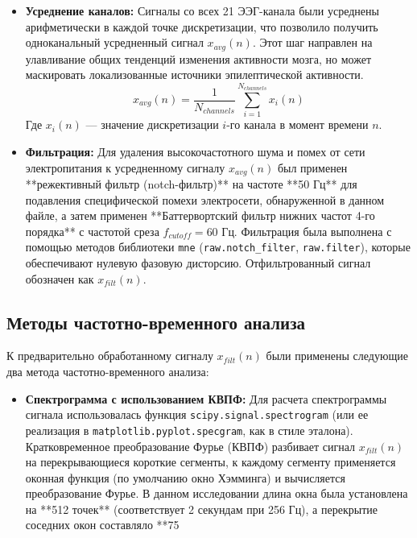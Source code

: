 \documentclass{article}
\begin{document}
\begin{paracol}{2}
\begin{itemize}
\item \textbf{Усреднение каналов:} Сигналы со всех 21 ЭЭГ-канала были усреднены арифметически в каждой точке дискретизации, что позволило получить одноканальный усредненный сигнал $x_{avg}(n)$. Этот шаг направлен на улавливание общих тенденций изменения активности мозга, но может маскировать локализованные источники эпилептической активности.
\[ x_{avg}(n) = \frac{1}{N_{channels}} \sum_{i=1}^{N_{channels}} x_i(n) \]
Где $x_i(n)$ — значение дискретизации $i$-го канала в момент времени $n$.

 \item \textbf{Фильтрация:} Для удаления высокочастотного шума и помех от сети электропитания к усредненному сигналу $x_{avg}(n)$ был применен **режективный фильтр (notch-фильтр)** на частоте **50 Гц** для подавления специфической помехи электросети, обнаруженной в данном файле, а затем применен **Баттервортский фильтр нижних частот 4-го порядка** с частотой среза $f_{cutoff} = 60$ Гц. Фильтрация была выполнена с помощью методов библиотеки \texttt{mne} (\texttt{raw.notch_filter}, \texttt{raw.filter}), которые обеспечивают нулевую фазовую дисторсию. Отфильтрованный сигнал обозначен как $x_{filt}(n)$. %
\end{itemize}

\subsection{Методы частотно-временного анализа} %

К предварительно обработанному сигналу $x_{filt}(n)$ были применены следующие два метода частотно-временного анализа:

\begin{itemize}
 \item \textbf{Спектрограмма с использованием КВПФ:}
 Для расчета спектрограммы сигнала использовалась функция \texttt{scipy.signal.spectrogram} (или ее реализация в \texttt{matplotlib.pyplot.specgram}, как в стиле эталона). Кратковременное преобразование Фурье (КВПФ) разбивает сигнал $x_{filt}(n)$ на перекрывающиеся короткие сегменты, к каждому сегменту применяется оконная функция (по умолчанию окно Хэмминга) и вычисляется преобразование Фурье. В данном исследовании длина окна была установлена на **512 точек** (соответствует 2 секундам при 256 Гц), а перекрытие соседних окон составляло **75%


\end{itemize}
\end{paracol}
\end{document}
